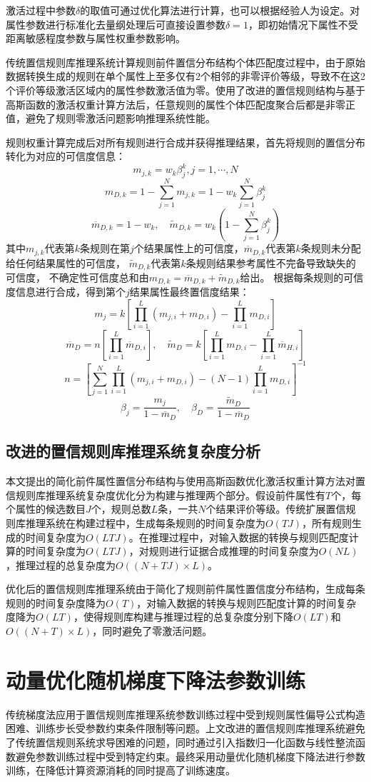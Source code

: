 \documentclass{cjc}
\begin{document}
激活过程中参数$\delta$的取值可通过优化算法进行计算，也可以根据经验人为设定。对属性参数进行标准化去量纲处理后可直接设置参数$\delta=1$，即初始情况下属性不受距离敏感程度参数与属性权重参数影响。

传统置信规则库推理系统计算规则前件置信分布结构个体匹配度过程中，由于原始数据转换生成的规则在单个属性上至多仅有2个相邻的非零评价等级，导致不在这2个评价等级激活区域内的属性参数激活值为零。使用了改进的置信规则结构与基于高斯函数的激活权重计算方法后，任意规则的属性个体匹配度聚合后都是非零正值，避免了规则零激活问题影响推理系统性能。

规则权重计算完成后对所有规则进行合成并获得推理结果，首先将规则的置信分布转化为对应的可信度信息：
$$m_{j,k}=w_k\beta_j^k,j=1,\cdots,N$$
$$m_{D,k}=1-\sum_{j=1}^Nm_{j,k}=1-w_k\sum_{j=1}^{N}\beta_j^k$$
$$\overline{m}_{D,k}=1-w_k,\quad\widetilde{m}_{D,k}=w_k(1-\sum_{j=1}^N\beta_j^k)$$
其中$m_{j,k}$代表第$k$条规则在第$j$个结果属性上的可信度，$\overline{m}_{D,k}$代表第$k$条规则未分配给任何结果属性的可信度，
$\widetilde{m}_{D,k}$代表第$k$条规则结果参考属性不完备导致缺失的可信度，
不确定性可信度总和由$m_{D,k}=\overline{m}_{D,k}+\widetilde{m}_{D,k}$给出。
根据每条规则的可信度信息进行合成，得到第个$j$结果属性最终置信度结果：
$$m_j=k[\prod_{i=1}^L(m_{j,i}+m_{D,i})-\prod_{i=1}^Lm_{D,i}]$$
$$\overline{m}_D=n[\prod_{i=1}^L\overline{m}_{D,i}],\quad\widetilde{m}_D=k[\prod_{i=1}^Lm_{D,i}-\prod_{i=1}^L\overline{m}_{H,i}]$$
$$n=[\sum_{j=1}^N\prod_{i=1}^L(m_{j,i}+m_{D,i})-(N-1)\prod_{i=1}^Lm_{D,i}]^{-1}$$
$$\beta_j=\frac{m_j}{1-\overline{m}_D},\quad\beta_D=\frac{\widetilde{m}_D}{1-\overline{m}_D}$$
\subsection{改进的置信规则库推理系统复杂度分析}
本文提出的简化前件属性置信分布结构与使用高斯函数优化激活权重计算方法对置信规则库推理系统复杂度优化分为构建与推理两个部分。假设前件属性有$T$个，每个属性的候选数目$J$个，规则总数$L$条，一共$N$个结果评价等级。传统扩展置信规则库推理系统在构建过程中，生成每条规则的时间复杂度为$O(TJ)$，所有规则生成的时间复杂度为$O(LTJ)$。在推理过程中，对输入数据的转换与规则匹配度计算的时间复杂度为$O(LTJ)$，对规则进行证据合成推理的时间复杂度为$O(NL)$，推理过程的总复杂度为$O((N+TJ)\times L)$。

优化后的置信规则库推理系统由于简化了规则前件属性置信度分布结构，生成每条规则的时间复杂度降为$O(T)$，对输入数据的转换与规则匹配度计算的时间复杂度降为$O(LT)$，使得规则库构建与推理过程的总复杂度分别下降$O(LT)$和$O((N+T)\times L)$，同时避免了零激活问题。
\section{动量优化随机梯度下降法参数训练}
传统梯度法应用于置信规则库推理系统参数训练过程中受到规则属性偏导公式构造困难、训练步长受参数约束条件限制等问题。上文改进的置信规则库推理系统避免了传统置信规则系统求导困难的问题，同时通过引入指数归一化函数与线性整流函数避免参数训练过程中受到特定约束。最终采用动量优化随机梯度下降法进行参数训练，在降低计算资源消耗的同时提高了训练速度。
\end{document}
